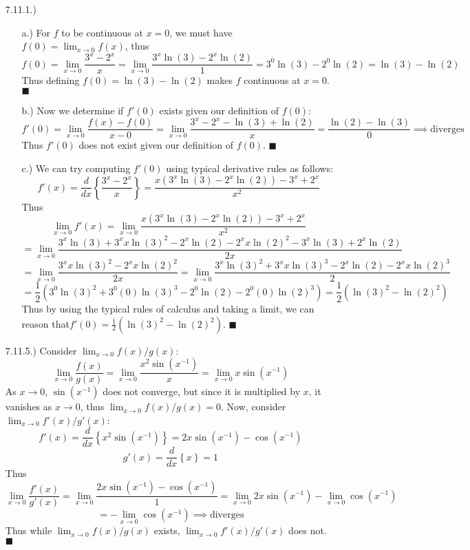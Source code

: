 \documentclass[11pt]{article}
\newcommand{\braces}[1]{\left\{#1\right\}}           %
\newcommand{\parens}[1]{\left(#1\right)}             %
\newcommand{\derv}[2]{\dfrac{d#1}{d#2}}
\newcommand{\lm}[1]{\displaystyle\lim_{#1}}
\begin{document}
\pagestyle{fancy}
\fancyhead{}

\normalsize

\begin{itemize}
    \item [7.11.1.)] \begin{itemize}
        \item [a.)] For $f$ to be continuous at $x=0$, we must have $f(0)=\lm{x\to0}f(x)$, thus
        \[f(0)=\lm{x\to0}\frac{3^x-2^x}{x}=\lm{x\to0}\frac{3^x\ln(3)-2^x\ln(2)}{1}=3^0\ln(3)-2^0\ln(2)=\ln(3)-\ln(2)\]
        Thus defining $f(0)=\ln(3)-\ln(2)$ makes $f$ continuous at $x=0$. $\blacksquare$

        \item [b.)] Now we determine if $f'(0)$ exists given our definition of $f(0)$:
        \[f'(0)=\lm{x\to0}\frac{f(x)-f(0)}{x-0}=\lm{x\to0}\frac{3^x-2^x-\ln(3)+\ln(2)}{x}=\frac{\ln(2)-\ln(3)}{0}\implies\text{diverges}\]
        Thus $f'(0)$ does not exist given our definition of $f(0)$. $\blacksquare$

        \item [c.)] We can try computing $f'(0)$ using typical derivative rules as follows:
        \[f'(x)=\derv{}{x}\braces{\frac{3^x-2^x}{x}}=\frac{x\parens{3^x\ln(3)-2^x\ln(2)}-3^x+2^x}{x^2}\]
        Thus
        \[\lm{x\to0}f'(x)=\lm{x\to0}\frac{x\parens{3^x\ln(3)-2^x\ln(2)}-3^x+2^x}{x^2}\]
        \[=\lm{x\to0}\frac{3^x\ln(3)+3^xx\ln(3)^2-2^x\ln(2)-2^xx\ln(2)^2-3^x\ln(3)+2^x\ln(2)}{2x}\]
        \[=\lm{x\to0}\frac{3^xx\ln(3)^2-2^xx\ln(2)^2}{2x}=\lm{x\to0}\frac{3^x\ln(3)^2+3^xx\ln(3)^3-2^x\ln(2)-2^xx\ln(2)^3}{2}\]
        \[=\frac{1}{2}\parens{3^0\ln(3)^2+3^0(0)\ln(3)^3-2^0\ln(2)-2^0(0)\ln(2)^3}=\frac{1}{2}\parens{\ln(3)^2-\ln(2)^2}\]
        Thus by using the typical rules of calculus and taking a limit, we can reason that\break$f'(0)=\frac{1}{2}\parens{\ln(3)^2-\ln(2)^2}$. $\blacksquare$
    \end{itemize}

    \item [7.11.5.)] Consider $\lm{x\to0}f(x)/g(x)$:
    \[\lm{x\to0}\frac{f(x)}{g(x)}=\lm{x\to0}\frac{x^2\sin\parens{x^{-1}}}{x}=\lm{x\to0}x\sin\parens{x^{-1}}\]
    As $x\to0$, $\sin\parens{x^{-1}}$ does not converge, but since it is multiplied by $x$, it vanishes as $x\to0$, thus $\lm{x\to0}f(x)/g(x)=0$. Now, consider $\lm{x\to0}f'(x)/g'(x)$:
    \[f'(x)=\derv{}{x}\braces{x^2\sin\parens{x^{-1}}}=2x\sin\parens{x^{-1}}-\cos\parens{x^{-1}}\]
    \[g'(x)=\derv{}{x}\braces{x}=1\]
    Thus
    \[\lm{x\to0}\frac{f'(x)}{g'(x)}=\lm{x\to0}\frac{2x\sin\parens{x^{-1}}-\cos\parens{x^{-1}}}{1}=\lm{x\to0}2x\sin\parens{x^{-1}}-\lm{x\to0}\cos\parens{x^{-1}}\]
    \[=-\lm{x\to0}\cos\parens{x^{-1}}\implies\text{diverges}\]
    Thus while $\lm{x\to0}f(x)/g(x)$ exists, $\lm{x\to0}f'(x)/g'(x)$ does not. $\blacksquare$
\end{itemize}
\end{document}
